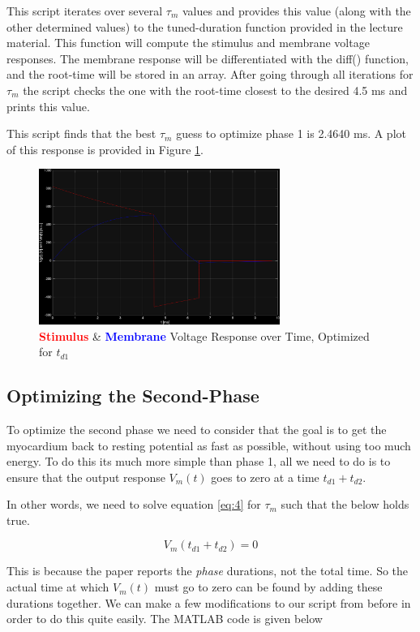 \documentclass[]{report}
\begin{document}
This script iterates over several $\tau_m$ values and provides this value (along with the other determined values) to the tuned-duration function provided in the lecture material. This function will compute the stimulus and membrane voltage responses. The membrane response will be differentiated with the diff() function, and the root-time will be stored in an array. After going through all iterations for $\tau_m$ the script checks the one with the root-time closest to the desired 4.5 ms and prints this value.

This script finds that the best $\tau_m$ guess to optimize phase 1 is 2.4640 ms. A plot of this response is provided in Figure \ref{fig:phase1}.

\begin{figure}[H]
	\centering
	\includegraphics[width=0.7\textwidth]{phase1_response.png}
	\caption{\textcolor{red}{\textbf{Stimulus}} \& \textcolor{blue}{\textbf{Membrane}} Voltage Response over Time, Optimized for $t_{d1}$}
	\label{fig:phase1}
\end{figure}


\subsection*{Optimizing the Second-Phase}

To optimize the second phase we need to consider that the goal is to get the myocardium back to resting potential as fast as possible, without using too much energy. To do this its much more simple than phase 1, all we need to do is to ensure that the output response $V_m (t)$ goes to zero at a time $t_{d1} + t_{d2}$.

In other words, we need to solve equation \ref{eq:4} for $\tau_m$ such that the below holds true.

\[
	V_m (t_{d1} + t_{d2}) = 0
\]

This is because the paper reports the \textit{phase} durations, not the total time. So the actual time at which $V_m (t)$ must go to zero can be found by adding these durations together. We can make a few modifications to our script from before in order to do this quite easily. The MATLAB code is given below
\end{document}

